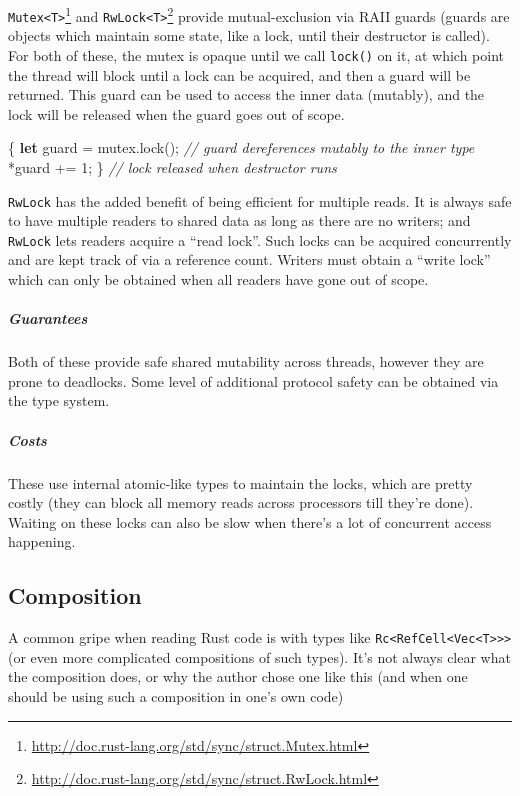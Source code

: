 \documentclass[a4paper,]{book}
\newenvironment{Shaded}{\begin{snugshade}}{\end{snugshade}}
\newcommand{\KeywordTok}[1]{\textcolor[rgb]{0.13,0.29,0.53}{\textbf{{#1}}}}
\newcommand{\DecValTok}[1]{\textcolor[rgb]{0.00,0.00,0.81}{{#1}}}
\newcommand{\CommentTok}[1]{\textcolor[rgb]{0.56,0.35,0.01}{\textit{{#1}}}}
\newcommand{\NormalTok}[1]{{#1}}
\renewcommand{\href}[2]{#2\footnote{\url{#1}}}
\let\oldsubparagraph\subparagraph
\renewcommand{\subparagraph}[1]{\oldsubparagraph{#1}\mbox{}}
\begin{document}
\href{http://doc.rust-lang.org/std/sync/struct.Mutex.html}{\texttt{Mutex\textless{}T\textgreater{}}}
and
\href{http://doc.rust-lang.org/std/sync/struct.RwLock.html}{\texttt{RwLock\textless{}T\textgreater{}}}
provide mutual-exclusion via RAII guards (guards are objects which
maintain some state, like a lock, until their destructor is called). For
both of these, the mutex is opaque until we call \texttt{lock()} on it,
at which point the thread will block until a lock can be acquired, and
then a guard will be returned. This guard can be used to access the
inner data (mutably), and the lock will be released when the guard goes
out of scope.

\begin{Shaded}
\begin{Highlighting}[]
\NormalTok{\{}
    \KeywordTok{let} \NormalTok{guard = mutex.lock();}
    \CommentTok{// guard dereferences mutably to the inner type}
    \NormalTok{*guard += }\DecValTok{1}\NormalTok{;}
\NormalTok{\} }\CommentTok{// lock released when destructor runs}
\end{Highlighting}
\end{Shaded}

\texttt{RwLock} has the added benefit of being efficient for multiple
reads. It is always safe to have multiple readers to shared data as long
as there are no writers; and \texttt{RwLock} lets readers acquire a
``read lock''. Such locks can be acquired concurrently and are kept
track of via a reference count. Writers must obtain a ``write lock''
which can only be obtained when all readers have gone out of scope.

\subparagraph{Guarantees}\label{guarantees-4}

Both of these provide safe shared mutability across threads, however
they are prone to deadlocks. Some level of additional protocol safety
can be obtained via the type system.

\subparagraph{Costs}\label{costs}

These use internal atomic-like types to maintain the locks, which are
pretty costly (they can block all memory reads across processors till
they're done). Waiting on these locks can also be slow when there's a
lot of concurrent access happening.

\subsection{Composition}\label{composition}

A common gripe when reading Rust code is with types like
\texttt{Rc\textless{}RefCell\textless{}Vec\textless{}T\textgreater{}\textgreater{}\textgreater{}}
(or even more complicated compositions of such types). It's not always
clear what the composition does, or why the author chose one like this
(and when one should be using such a composition in one's own code)
\end{document}
